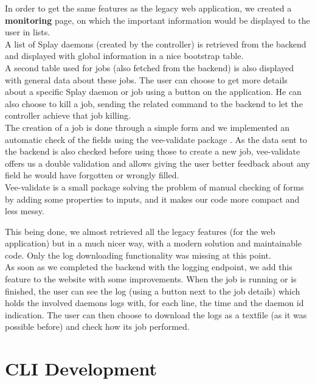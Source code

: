 \documentclass{eplmastersthesis}
\begin{document}
        In order to get the same features as the legacy web application,
        we created a \textbf{monitoring} page, on which the important
        information would be displayed to the user in lists.\\
        A list of Splay daemons (created by the controller) is retrieved
        from the backend and displayed with global information in a nice
        bootstrap table.\\
        A second table used for jobs (also fetched from the backend) is also
        displayed with general data about these jobs. The user can choose to
        get more details about a specific Splay daemon or job using a button
        on the application. He can also choose to kill a job, sending the
        related command to the backend to let the controller achieve that job
        killing.\\
        The creation of a job is done through a simple form and we implemented
        an automatic check of the fields using the vee-validate package
        \cite{VeeValidate}. As the data sent to the backend is also checked
        before using those to create a new job, vee-validate offers us
        a double validation and allows giving the user better feedback
        about any field he would have forgotten or wrongly filled.\\
        Vee-validate is a small package solving the problem of
        manual checking of forms by adding some properties to inputs, and it
        makes our code more compact and less messy.

        This being done, we almost retrieved all the legacy features (for the
        web application) but in a much nicer way, with a modern solution
        and maintainable code. Only the log downloading functionality was
        missing at this point. \\
        As soon as we completed the backend with the logging endpoint, we
        add this feature to the website with some improvements. When the
        job is running or is finished, the user can see the log (using a
        button next to the job details) which holds the involved daemons logs
        with, for each line, the time and the daemon id indication. The user
        can then choose to download the logs as a textfile (as it was possible
        before) and check how its job performed.

    \section{CLI Development}
\end{document}
